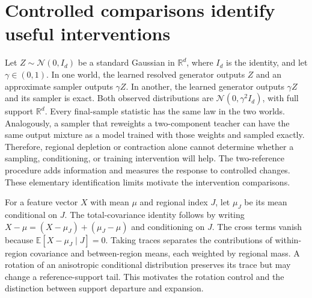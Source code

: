 \section{Controlled comparisons identify useful interventions}
\label{supp:causality}
Let $Z\sim\mathcal N(0,I_d)$ be a standard Gaussian in $\mathbb R^d$,
where $I_d$ is the identity, and let $\gamma\in(0,1)$.
In one world, the learned resolved generator outputs $Z$ and an approximate
sampler outputs $\gamma Z$. In another, the learned generator outputs
$\gamma Z$ and its sampler is exact. Both observed distributions are
$\mathcal N(0,\gamma^2 I_d)$, with full support $\mathbb R^d$.
Every final-sample statistic has the same law in the two worlds. Analogously,
a sampler that reweights a two-component teacher can have the same output
mixture as a model trained with those weights and sampled exactly. Therefore,
regional depletion or contraction alone cannot determine whether a sampling,
conditioning, or training intervention will help. The two-reference procedure
adds information and measures the response to controlled changes. These elementary identification limits motivate the intervention comparisons.

For a feature vector $X$ with mean $\mu$ and regional index $J$, let
$\mu_J$ be its mean conditional on $J$. The total-covariance identity
follows by writing
$X-\mu=(X-\mu_J)+(\mu_J-\mu)$ and conditioning on $J$. The cross terms vanish
because $\mathbb E[X-\mu_J\mid J]=0$. Taking traces separates the contributions
of within-region covariance and between-region means, each weighted by regional
mass. A rotation of an anisotropic conditional distribution preserves its trace
but may change a reference-support tail. This motivates the rotation control
and the distinction between support departure and expansion.


